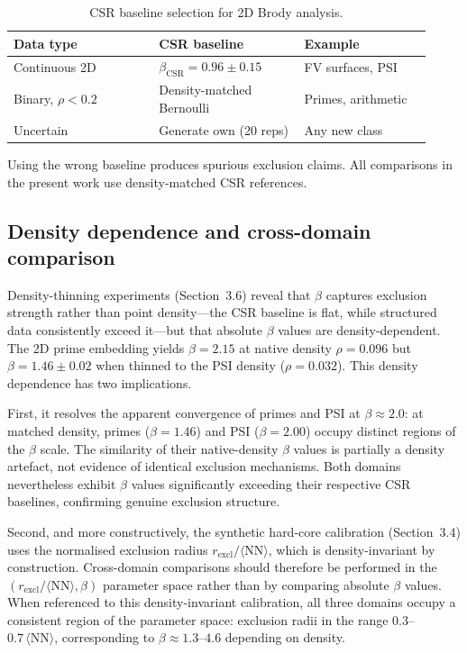 \documentclass[final,1p,times]{elsarticle}
\theoremstyle{definition}
\begin{document}
\begin{table}[htbp]
  \centering
  \caption{CSR baseline selection for 2D Brody analysis.}
  \label{tab:csr-baseline}
  \small
  \begin{tabular}{@{}p{0.32\linewidth}p{0.32\linewidth}p{0.28\linewidth}@{}}
    \toprule
    Data type & CSR baseline & Example \\
    \midrule
    Continuous 2D & $\beta_{\text{CSR}}=0.96\pm0.15$ & FV surfaces, PSI \\
    Binary, $\rho<0.2$ & Density-matched Bernoulli & Primes, arithmetic \\
    Uncertain & Generate own (20 reps) & Any new class \\
    \bottomrule
  \end{tabular}
\end{table}

Using the wrong baseline produces spurious exclusion claims. All
comparisons in the present work use density-matched CSR references.

\subsection{Density dependence and cross-domain comparison}

Density-thinning experiments (Section~3.6) reveal that $\beta$ captures
exclusion strength rather than point density---the CSR baseline is
flat, while structured data consistently exceed it---but that absolute
$\beta$ values are density-dependent. The 2D prime embedding yields
$\beta = 2.15$ at native density $\rho = 0.096$ but $\beta = 1.46 \pm
0.02$ when thinned to the PSI density ($\rho = 0.032$). This
density dependence has two implications.

First, it resolves the apparent convergence of primes and PSI at
$\beta \approx 2.0$: at matched density, primes ($\beta = 1.46$) and
PSI ($\beta = 2.00$) occupy distinct regions of the $\beta$ scale. The
similarity of their native-density $\beta$ values is partially a density
artefact, not evidence of identical exclusion mechanisms. Both domains
nevertheless exhibit $\beta$ values significantly exceeding their
respective CSR baselines, confirming genuine exclusion structure.

Second, and more constructively, the synthetic hard-core calibration
(Section~3.4) uses the normalised exclusion radius
$r_{\text{excl}}/\langle\text{NN}\rangle$, which is density-invariant
by construction. Cross-domain comparisons should therefore be performed
in the $(r_{\text{excl}}/\langle\text{NN}\rangle, \beta)$ parameter
space rather than by comparing absolute $\beta$ values. When referenced
to this density-invariant calibration, all three domains occupy a
consistent region of the parameter space: exclusion radii in the range
$0.3$--$0.7\,\langle\text{NN}\rangle$, corresponding to $\beta \approx
1.3$--$4.6$ depending on density.
\end{document}
